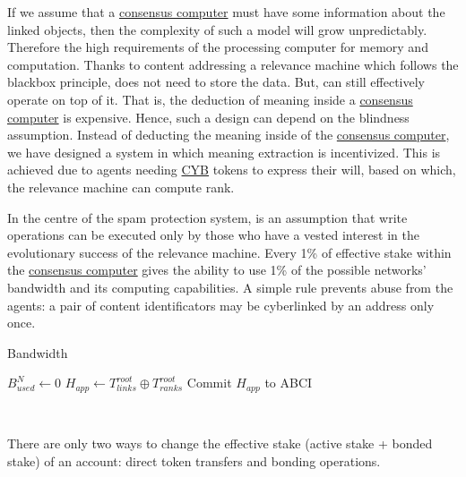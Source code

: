 \documentclass[8pt,oneside]{amsart}
\begin{document}
If we assume that a {\hyperref[consensus-computer]{consensus computer}} must have some information about the linked objects, then the complexity of such a model will grow unpredictably. Therefore the high requirements of the processing computer for memory and computation. Thanks to content addressing a relevance machine which follows the blackbox principle, does not need to store the data. But, can still effectively operate on top of it. That is, the deduction of meaning inside a {\hyperref[consensus-computer]{consensus computer}} is expensive. Hence, such a design can depend on the blindness assumption. Instead of deducting the meaning inside of the {\hyperref[consensus-computer]{consensus computer}}, we have designed a system in which meaning extraction is incentivized. This is achieved due to agents needing {\hyperref[cyb]{CYB}} tokens to express their will, based on which, the relevance machine can compute rank.

In the centre of the spam protection system, is an assumption that write operations can be executed only by those who have a vested interest in the evolutionary success of the relevance machine. Every 1\% of effective stake within the {\hyperref[consensus-computer]{consensus computer}} gives the ability to use 1\% of the possible networks' bandwidth and its computing capabilities. A simple rule prevents abuse from the agents: a pair of content identificators may be cyberlinked by an address only once.

\begin{algorithm}
\caption{Bandwidth}\label{bandwidth-algo}
$B^{N}_{used} \leftarrow 0$\;
\BlankLine
$H_{app} \leftarrow T^{root}_{links} \oplus T^{root}_{ranks}$\;
Commit $H_{app}$ to ABCI\;
\end{algorithm}\

There are only two ways to change the effective stake (active stake + bonded stake) of an account: direct token transfers and bonding operations.
\end{document}
